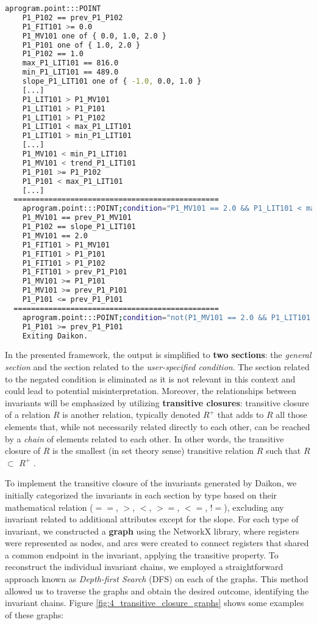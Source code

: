 \begin{lstlisting}[language=bash,numbers=none,caption={Standard Daikon output for \texttt{PLC1} of the iTrust SWaT system},label=lst:4_daikon_output_plc1]
	aprogram.point:::POINT
	P1_P102 == prev_P1_P102
	P1_FIT101 >= 0.0
	P1_MV101 one of { 0.0, 1.0, 2.0 }
	P1_P101 one of { 1.0, 2.0 }
	P1_P102 == 1.0
	max_P1_LIT101 == 816.0
	min_P1_LIT101 == 489.0
	slope_P1_LIT101 one of { -1.0, 0.0, 1.0 }
	[...]
	P1_LIT101 > P1_MV101
	P1_LIT101 > P1_P101
	P1_LIT101 > P1_P102
	P1_LIT101 < max_P1_LIT101
	P1_LIT101 > min_P1_LIT101
	[...]
	P1_MV101 < min_P1_LIT101
	P1_MV101 < trend_P1_LIT101
	P1_P101 >= P1_P102
	P1_P101 < max_P1_LIT101
	[...]
  ===============================================
	aprogram.point:::POINT;condition="P1_MV101 == 2.0 && P1_LIT101 < max_P1_LIT101 - 16 && P1_LIT101 > min_P1_LIT101 + 15"
	P1_MV101 == prev_P1_MV101
	P1_P102 == slope_P1_LIT101
	P1_MV101 == 2.0
	P1_FIT101 > P1_MV101
	P1_FIT101 > P1_P101
	P1_FIT101 > P1_P102
	P1_FIT101 > prev_P1_P101
	P1_MV101 >= P1_P101
	P1_MV101 >= prev_P1_P101
	P1_P101 <= prev_P1_P101
  ===============================================
	aprogram.point:::POINT;condition="not(P1_MV101 == 2.0 && P1_LIT101 < max_P1_LIT101 - 16 && P1_LIT101 > min_P1_LIT101 + 15)"
	P1_P101 >= prev_P1_P101
	Exiting Daikon.
\end{lstlisting}

In the presented framework, the output is simplified to \textbf{two sections}: the \textit{general section} and the section related to the \textit{user-specified condition}. The section related to the negated condition is eliminated as it is not relevant in this context and could lead to potential misinterpretation. Moreover, the relationships between invariants will be emphasized by utilizing \textbf{transitive closures}: transitive closure of a relation $R$ is another relation, typically denoted $R^{+}$ that adds to $R$ all those elements that, while not necessarily related directly to each other, can be reached by a \textit{chain} of elements related to each other. In other words, the transitive closure of $R$ is the smallest (in set theory sense) transitive relation $R$ such that $R$ $\subset$ $R^{+}$ \cite{transitive_closures}. 

\bigskip
To implement the transitive closure of the invariants generated by Daikon, we initially categorized the invariants in each section by type based on their mathematical relation ($==$, $>$, $<$, $>=$, $<=$, $!=$), excluding any invariant related to additional attributes except for the slope. For each type of invariant, we constructed a \textbf{graph} using the NetworkX library, where registers were represented as nodes, and arcs were created to connect registers that shared a common endpoint in the invariant, applying the transitive property. To reconstruct the individual invariant chains, we employed a straightforward approach known as \textit{Depth-first Search} (DFS) on each of the graphs. This method allowed us to traverse the graphs and obtain the desired outcome, identifying the invariant chains. Figure \ref{fig:4_transitive_closure_graphs} shows some examples of these graphs:

